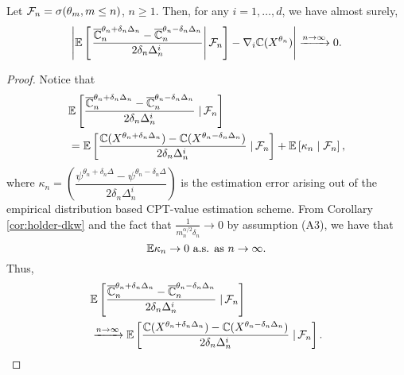 \begin{lemma}
\label{lemma:1spsa-bias}
Let $\mathcal{F}_n = \sigma(\theta_m,m\le n)$, $n\ge 1$.
Then, for any $i = 1,\ldots,d$, we have almost surely,  
\begin{align*}
\left| \mathbb{E}\left[\left.\dfrac{\overline {\mathbb{C}}_n^{\theta_n+\delta_n \Delta_n} -\overline {\mathbb{C}}_n^{\theta_n-\delta_n \Delta_n}}{2 \delta_n \Delta_n^{i}}\right| \mathcal{F}_n \right] - \nabla_i \mathbb{C}(X^{\theta_n}) \right| \xrightarrow{n \rightarrow\infty} 0.
\end{align*} 
\end{lemma}
\begin{proof}
Notice that
\begin{align}
&\mathbb{E}\left[\dfrac{\overline {\mathbb{C}}_n^{\theta_n+\delta_n \Delta_n} -\overline {\mathbb{C}}_n^{\theta_n-\delta_n \Delta_n}}{2 \delta_n \Delta_n^{i}} \left.\right| \mathcal{F}_n\right] \\
&= \mathbb{E}\left[\dfrac{\mathbb{C}(X^{\theta_n + \delta_n \Delta_n}) - \mathbb{C}(X^{\theta_n - \delta_n \Delta_n})}{2 \delta_n \Delta_n^{i}} \left.\right| \mathcal{F}_n\right] + \mathbb{E}\left[ \kappa_n \mid \mathcal{F}_n\right],
\end{align}
where $\kappa_n = \left(\dfrac{\psi^{\theta_n +\delta_n\Delta} - \psi^{\theta_n-\delta_n\Delta}}{2\delta_n\Delta_n^{i}}\right)$
 is the estimation error arising out of the empirical distribution based CPT-value estimation scheme.
From Corollary \ref{cor:holder-dkw} and the fact that $\frac{1}{m_n^{\alpha/2} \delta_n} \rightarrow 0$ by assumption (A3), we have that
$$\mathbb{E} \kappa_n \rightarrow 0 \text{ a.s. as } n \rightarrow \infty.$$ 
Thus,
\begin{align}
&\mathbb{E}\left[\dfrac{\overline {\mathbb{C}}_n^{\theta_n+\delta_n \Delta_n} -\overline {\mathbb{C}}_n^{\theta_n-\delta_n \Delta_n}}{2 \delta_n \Delta_n^{i}} \left.\right| \mathcal{F}_n\right] \nonumber\\
&\xrightarrow{n\rightarrow\infty}  \mathbb{E}\left[\dfrac{\mathbb{C}(X^{\theta_n + \delta_n \Delta_n}) -\mathbb{C}(X^{\theta_n - \delta_n \Delta_n})}{2 \delta_n \Delta_n^{i}} \left.\right| \mathcal{F}_n\right].  \label{eq:l1}
\end{align}

\end{proof}
